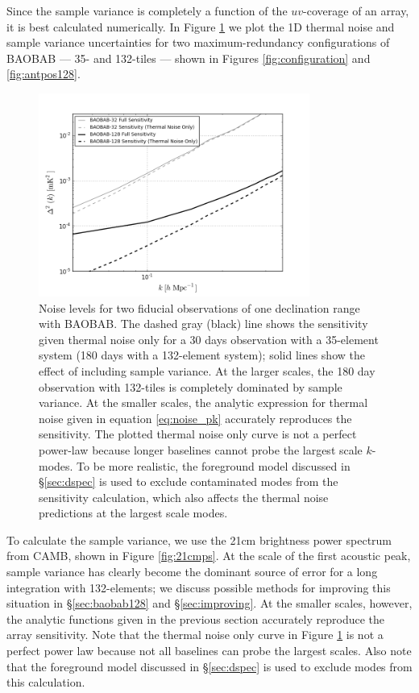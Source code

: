 \documentclass[10pt,iop]{emulateapj}
\begin{document}
Since the sample variance is completely a function of the $uv$-coverage of an array,
it is best calculated
numerically.  In Figure \ref{fig:sense_wwo_samp_var} we plot the 1D thermal noise and 
sample variance uncertainties for
two maximum-redundancy configurations of BAOBAB --- 35- and 132-tiles ---
shown in Figures \ref{fig:configuration} and \ref{fig:antpos128}.
\begin{figure}\centering
\includegraphics[width=3.5in]{sense_wwo_samp_var-2.png}
\caption{Noise levels for two fiducial observations of one declination range with BAOBAB.  
The dashed gray (black) line shows
the sensitivity given thermal noise only for a 30 days observation with a 35-element system
(180 days with a 132-element system); 
solid lines show the effect of including sample variance.  
At the larger scales, the 180 day observation with 132-tiles is completely dominated by sample
variance.
At the smaller scales, the analytic expression for thermal noise
given in equation \ref{eq:noise_pk} accurately reproduces the sensitivity.  The plotted thermal noise
only curve is not a perfect power-law because longer baselines cannot probe the largest scale
$k$-modes.  To be more realistic, the foreground model discussed in \S\ref{sec:dspec}
is used to exclude contaminated modes from the sensitivity calculation, which also affects
the thermal noise predictions at the largest scale modes.
} \label{fig:sense_wwo_samp_var}
\end{figure}  
To calculate the sample variance,
we use the 21cm brightness power spectrum from CAMB, shown in Figure \ref{fig:21cmps}.
At the scale of the first acoustic peak, sample variance has clearly become the dominant source 
of error for a long integration with 132-elements; we discuss possible methods for improving this
situation in \S\ref{sec:baobab128} and \S\ref{sec:improving}.  At the smaller scales, however, the analytic functions given in
the previous section accurately reproduce the array sensitivity.  Note that the thermal noise
only curve in Figure \ref{fig:sense_wwo_samp_var} is not a perfect power law because not all 
baselines can probe the largest scales.  Also note that the foreground model discussed in
\S\ref{sec:dspec} is used to exclude modes from this calculation.
\end{document}

